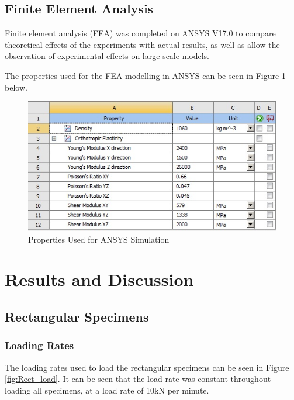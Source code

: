\documentclass[11pt,a4paper]{article}
\numberwithin{equation}{subsection}
\begin{document}
\subsection{Finite Element Analysis}
Finite element analysis (FEA) was completed on ANSYS V17.0 to compare theoretical effects of the experiments with actual results, as well as allow the observation of experimental effects on large scale models. 

\vspace*{\baselineskip}

\noindent
The properties used for the FEA modelling in ANSYS can  be seen in Figure \ref{fig:Properties} below.
\begin{figure}[h]
	\begin{center}
		\includegraphics[scale=0.8]{Ansys_Properties}
	\end{center}
	\caption{Properties Used for ANSYS Simulation}
	\label{fig:Properties}
\end{figure}
\pagebreak
\vspace*{\baselineskip}
\pagebreak

\section{Results and Discussion}

\subsection{Rectangular Specimens}
\subsubsection{Loading Rates}
The loading rates used to load the rectangular specimens can be seen in Figure \ref{fig:Rect_load}. It can be seen that the load rate was constant throughout loading all specimens, at a load rate of 10kN per minute. 
\end{document}
